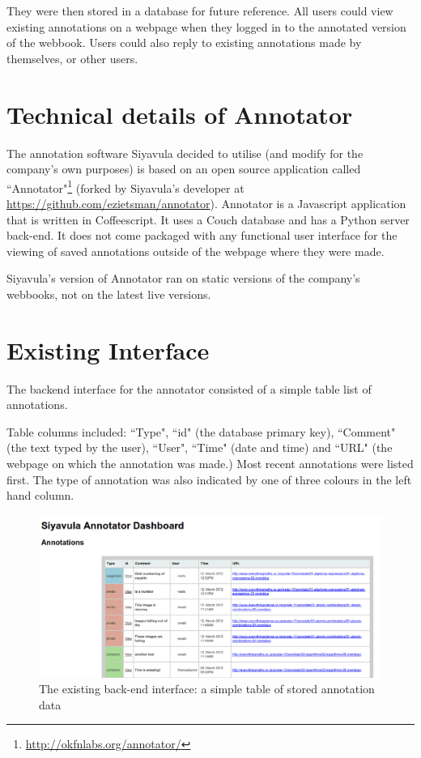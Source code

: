 They were then stored in a database for future reference. All users could view existing annotations on a webpage when they logged in to the annotated version of the webbook. Users could also reply to existing annotations made by themselves, or other users.

\section{Technical details of Annotator}
The annotation software Siyavula decided to utilise (and modify for the company's own purposes) is based on an open source application called ``Annotator"\footnote{\href{ http://okfnlabs.org/annotator/}{ http://okfnlabs.org/annotator/}} (forked by Siyavula's developer at \href{https://github.com/ezietsman/annotator}{https://github.com/ezietsman/annotator}). Annotator is a Javascript application that is written in Coffeescript. It uses a Couch database and has a Python server back-end. It does not come packaged with any functional user interface for the viewing of saved annotations outside of the webpage where they were made.

Siyavula's version of Annotator ran on static versions of the company's webbooks, not on the latest live versions.

\section{Existing Interface}
The backend interface for the annotator consisted of a simple table list of annotations.

Table columns included: ``Type", ``id" (the database primary key), ``Comment" (the text typed by the user), ``User", ``Time" (date and time) and ``URL" (the webpage on which the annotation was made.) Most recent annotations were listed first. The type of annotation was also indicated by one of three colours in the left hand column.
\begin{figure}[h]
    \centering
    \includegraphics[width=\textwidth]{Figures/annotator-backend-table.png}
 \caption{The existing back-end interface: a simple table of stored annotation data}
\end{figure}

